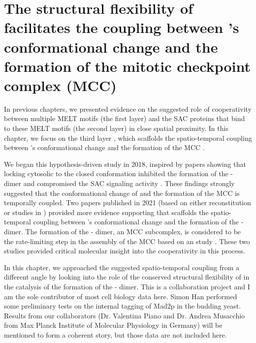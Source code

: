 \chapter{The structural flexibility of  facilitates the coupling between 's conformational change and the formation of the mitotic checkpoint complex (MCC)}
\label{chpt:4}

In previous chapters, we presented evidence on the suggested role of cooperativity between multiple MELT motifs (the first layer) and the SAC proteins that bind to these MELT motifs (the second layer) in close spatial proximity. In this chapter, we focus on the third layer , which scaffolds the spatio-temporal coupling between 's conformational change and the formation of the MCC \cite{BUB1-CDC20-MAD1,Tripartite}. %

We began this hypothesis-driven study in 2018, inspired by papers showing that locking cytosolic  to the closed conformation inhibited the formation of the - dimer and compromised the SAC signaling activity \cite{Ma+Poon2016,Ma+Poon2018,Kim2018}. These findings strongly suggested that the conformational change of  and the formation of the MCC is temporally coupled. Two papers published in 2021 (based on either  reconstitution \cite{BUB1-CDC20-MAD1} or studies in  \cite{Tripartite}) provided more evidence supporting that  scaffolds the spatio-temporal coupling between 's conformational change and the formation of the - dimer. The formation of the - dimer, an MCC subcomplex, is considered to be the rate-limiting step in the assembly of the MCC based on an  study \cite{Faesen2017}. These two studies provided critical molecular insight into the cooperativity in this process.

In this chapter, we approached the suggested spatio-temporal coupling from a different angle by looking into the role of the conserved structural flexibility of  in the catalysis of the formation of the - dimer. This is a collaboration project and I am the sole contributor of most cell biology data here. Simon Han performed some preliminary tests on the internal tagging of Mad2p in the budding yeast. Results from our collaborators (Dr. Valentina Piano and Dr. Andrea Musacchio from Max Planck Institute of Molecular Physiology in Germany) will be mentioned to form a coherent story, but those data are not included here.

